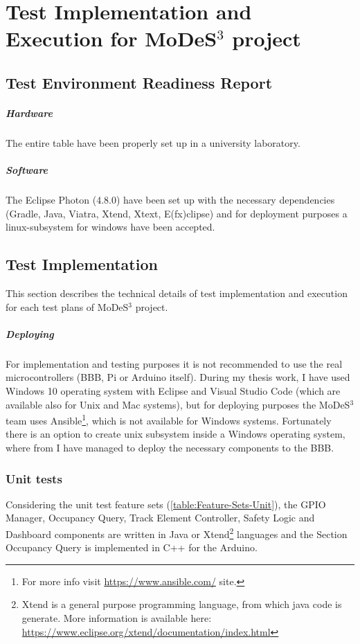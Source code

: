 \chapter{Test Implementation and Execution for MoDeS$^3$ project}\label{TestImpl:MODES}

\section{Test Environment Readiness Report}
\paragraph{Hardware} The entire table have been properly set up in a university laboratory.
\paragraph{Software} The Eclipse Photon (4.8.0) have been set up with the necessary dependencies (Gradle, Java, Viatra, Xtend, Xtext, E(fx)clipse) and for deployment purposes a linux-subsystem for windows have been accepted.

\section{Test Implementation}
This section describes the technical details of test implementation and execution for each test plans of MoDeS$^3$ project.
\paragraph{Deploying} For implementation and testing purposes it is not recommended to use the real microcontrollers (BBB, Pi or Arduino itself). During my thesis work, I have used Windows 10 operating system with Eclipse and Visual Studio Code (which are available also for Unix and Mac systems), but for deploying purposes the MoDeS$^3$ team uses Ansible\footnote{For more info visit \url{https://www.ansible.com/} site.}, which is not available for Windows systems. Fortunately there is an option to create unix subsystem inside a Windows operating system, where from I have managed to deploy the necessary components to the BBB.

\subsection{Unit tests} Considering the unit test feature sets (\autoref{table:Feature-Sets-Unit}), the GPIO Manager, Occupancy Query, Track Element Controller, Safety Logic and Dashboard components are written in Java or Xtend\footnote{Xtend is a general purpose programming language, from which java code is generate. More information is available here: \url{https://www.eclipse.org/xtend/documentation/index.html}} languages and the Section Occupancy Query is implemented in C++ for the Arduino. 

